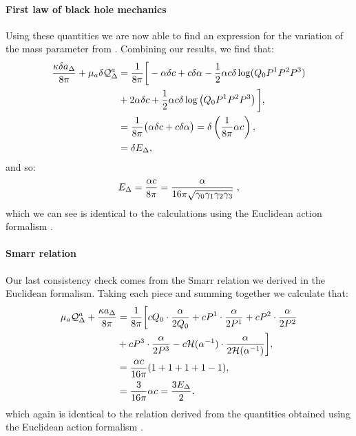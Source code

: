 \paragraph{First law of black hole mechanics}
Using these quantities we are now able to find an expression for the variation of the mass parameter from . Combining our results, we find that:
\begin{equation*}
    \begin{aligned}
        \frac{\kappa \delta a_\Delta}{8\pi} + \mu_a \delta \mathcal{Q}^a_\Delta &= {1 \over 8 \pi} \bigg[ -\alpha  \delta c +  c \delta \alpha - \frac{1}{2} \alpha  c \delta \log(Q_0 P^1 P^2 P^3)\\
        &+ 2 \alpha  \delta c + \frac{1}{2} \alpha  c \delta \log \left(Q_0 P^1 P^2 P^3 \right) \bigg], \\
        &= {1 \over 8 \pi} \big( \alpha \delta c +  c \delta \alpha \big) = \delta \left( {1 \over 8 \pi} \alpha c \right), \\
        &= \delta E_\Delta,
    \end{aligned}
\end{equation*}
and so:
\begin{equation*}
    E_\Delta = {\alpha c\over 8 \pi} = \frac{\alpha}{16 \pi \sqrt{\gamma_0 \gamma_1 \gamma_2 \gamma_3}} \;,
\end{equation*}
which we can see is identical to the calculations using the Euclidean action formalism .

\paragraph{Smarr relation}
Our last consistency check comes from the Smarr relation we derived in the Euclidean formalism. Taking each piece and summing together we calculate that:
\begin{equation*}
\begin{aligned}
        \mu_a \mathcal{Q}^a_\Delta + {\kappa a_\Delta \over 8 \pi} &=  {1 \over 8 \pi} \bigg[c Q_0 \cdot \frac{\alpha}{2Q_0} +  c P^1 \cdot \frac{\alpha}{2P^1} +  c P^2 \cdot \frac{\alpha}{2P^2} \\ 
        &+  c P^3 \cdot \frac{\alpha}{2P^3} -  c {\cal H}(\alpha^{-1}) \cdot \frac{\alpha}{2 {\cal H}(\alpha^{-1})} \bigg],\\
        &= \frac{ \alpha c}{16 \pi} (1 + 1 + 1 + 1 - 1), \\
        &= \frac{3}{16 \pi}  \alpha c = \frac{3 E_\Delta}{2},
\end{aligned}
\end{equation*}
which again is identical to the relation derived from the quantities obtained using the Euclidean action formalism .

